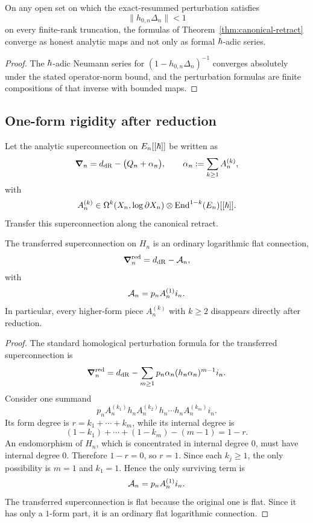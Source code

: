 \begin{proposition}\label{prop:analytic-retract}
On any open set on which the exact-resummed perturbation satisfies
\[
 \|h_{0,n}\Delta_n\|<1
\]
on every finite-rank truncation, the formulas of Theorem~\ref{thm:canonical-retract} converge as honest analytic maps and not only as formal $\hbar$-adic series.
\end{proposition}

\begin{proof}
The $\hbar$-adic Neumann series for $(1-h_{0,n}\Delta_n)^{-1}$ converges absolutely under the stated operator-norm bound, and the perturbation formulas are finite compositions of that inverse with bounded maps.
\end{proof}

\subsection{One-form rigidity after reduction}
Let the analytic superconnection on $E_n[[\hbar]]$ be written as
\[
 \boldsymbol{\nabla}_n = d_{\mathrm{dR}}-\big(Q_n+\alpha_n\big),
 \qquad
 \alpha_n:=\sum_{k\ge 1}A_n^{(k)},
\]
with
\[
 A_n^{(k)}\in \Omega^k(X_n,\log\partial X_n)\otimes \mathrm{End}^{1-k}(E_n)[[\hbar]].
\]
Transfer this superconnection along the canonical retract.

\begin{theorem}\label{thm:one-form-rigidity}
The transferred superconnection on $H_n$ is an ordinary logarithmic flat connection,
\[
 \boldsymbol{\nabla}_n^{\mathrm{red}} = d_{\mathrm{dR}}-\mathcal A_n,
\]
with
\[
 \mathcal A_n = p_nA_n^{(1)}i_n.
\]
In particular, every higher-form piece $A_n^{(k)}$ with $k\ge 2$ disappears directly after reduction.
\end{theorem}

\begin{proof}
The standard homological perturbation formula for the transferred superconnection is
\[
 \boldsymbol{\nabla}_n^{\mathrm{red}}
 =
 d_{\mathrm{dR}}-\sum_{m\ge 1} p_n\alpha_n(h_n\alpha_n)^{m-1}i_n.
\]
Consider one summand
\[
 p_n A_n^{(k_1)} h_n A_n^{(k_2)} h_n \cdots h_n A_n^{(k_m)} i_n.
\]
Its form degree is $r=k_1+\cdots+k_m$, while its internal degree is
\[
 (1-k_1)+\cdots+(1-k_m)-(m-1)=1-r.
\]
An endomorphism of $H_n$, which is concentrated in internal degree $0$, must have internal degree $0$. Therefore $1-r=0$, so $r=1$. Since each $k_j\ge 1$, the only possibility is $m=1$ and $k_1=1$. Hence the only surviving term is
\[
 \mathcal A_n = p_nA_n^{(1)}i_n.
\]
The transferred superconnection is flat because the original one is flat. Since it has only a $1$-form part, it is an ordinary flat logarithmic connection.
\end{proof}


